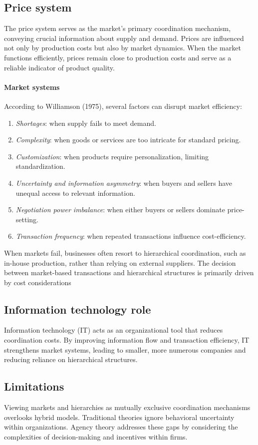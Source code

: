 \subsection{Price system}
The price system serves as the market's primary coordination mechanism, conveying crucial information about supply and demand. 
Prices are influenced not only by production costs but also by market dynamics. 
When the market functions efficiently, prices remain close to production costs and serve as a reliable indicator of product quality.

\paragraph*{Market systems}
According to Williamson (1975), several factors can disrupt market efficiency:
\begin{enumerate}
    \item \textit{Shortages}: when supply fails to meet demand.
    \item \textit{Complexity}: when goods or services are too intricate for standard pricing.
    \item \textit{Customization}: when products require personalization, limiting standardization.
    \item \textit{Uncertainty and information asymmetry}: when buyers and sellers have unequal access to relevant information.
    \item \textit{Negotiation power imbalance}: when either buyers or sellers dominate price-setting.
    \item \textit{Transaction frequency}: when repeated transactions influence cost-efficiency.
    
\end{enumerate}
\noindent When markets fail, businesses often resort to hierarchical coordination, such as in-house production, rather than relying on external suppliers. 
The decision between market-based transactions and hierarchical structures is primarily driven by cost considerations

\subsection{Information technology role}
Information technology (IT) acts as an organizational tool that reduces coordination costs. 
By improving information flow and transaction efficiency, IT strengthens market systems, leading to smaller, more numerous companies and reducing reliance on hierarchical structures.

\subsection{Limitations}
Viewing markets and hierarchies as mutually exclusive coordination mechanisms overlooks hybrid models.
Traditional theories ignore behavioral uncertainty within organizations.
Agency theory addresses these gaps by considering the complexities of decision-making and incentives within firms.